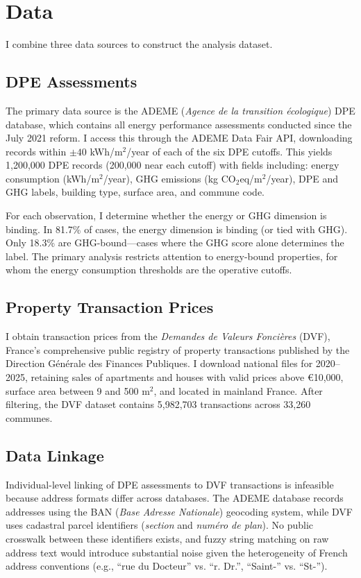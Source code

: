\documentclass[12pt]{article}
\begin{document}
\section{Data}

I combine three data sources to construct the analysis dataset.

\subsection{DPE Assessments}

The primary data source is the ADEME (\textit{Agence de la transition \'ecologique}) DPE database, which contains all energy performance assessments conducted since the July 2021 reform. I access this through the ADEME Data Fair API, downloading records within $\pm 40$ kWh/m$^2$/year of each of the six DPE cutoffs. This yields 1,200,000 DPE records (200,000 near each cutoff) with fields including: energy consumption (kWh/m$^2$/year), GHG emissions (kg CO$_2$eq/m$^2$/year), DPE and GHG labels, building type, surface area, and commune code.

For each observation, I determine whether the energy or GHG dimension is binding. In 81.7\% of cases, the energy dimension is binding (or tied with GHG). Only 18.3\% are GHG-bound---cases where the GHG score alone determines the label. The primary analysis restricts attention to energy-bound properties, for whom the energy consumption thresholds are the operative cutoffs.

\subsection{Property Transaction Prices}

I obtain transaction prices from the \textit{Demandes de Valeurs Fonci\`eres} (DVF), France's comprehensive public registry of property transactions published by the Direction G\'en\'erale des Finances Publiques. I download national files for 2020--2025, retaining sales of apartments and houses with valid prices above \euro 10,000, surface area between 9 and 500 m$^2$, and located in mainland France. After filtering, the DVF dataset contains 5,982,703 transactions across 33,260 communes.

\subsection{Data Linkage}

Individual-level linking of DPE assessments to DVF transactions is infeasible because address formats differ across databases. The ADEME database records addresses using the BAN (\textit{Base Adresse Nationale}) geocoding system, while DVF uses cadastral parcel identifiers (\textit{section} and \textit{num\'ero de plan}). No public crosswalk between these identifiers exists, and fuzzy string matching on raw address text would introduce substantial noise given the heterogeneity of French address conventions (e.g., ``rue du Docteur'' vs. ``r. Dr.'', ``Saint-'' vs. ``St-'').
\end{document}
